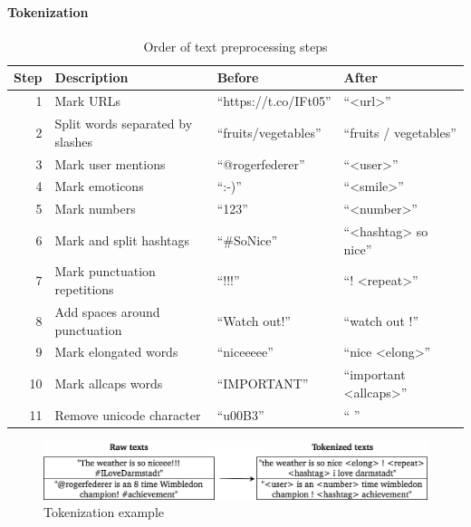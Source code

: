 \paragraph{Tokenization}
\label{sub:tokenization}


\begin{table}
\begin{tabular}{rlll}
\toprule
Step & Description & Before & After \\
\midrule
1 & Mark URLs & ``https://t.co/IFt05'' & ``<url>'' \\
2 & Split words separated by slashes & ``fruits/vegetables'' & ``fruits / vegetables'' \\
3 & Mark user mentions & ``@rogerfederer'' & ``<user>'' \\
4 & Mark emoticons & ``:-)'' & ``<smile>'' \\
5 & Mark numbers & ``123'' & ``<number>'' \\
6 & Mark and split hashtags & ``\#SoNice'' & ``<hashtag> so nice'' \\
7 & Mark punctuation repetitions & ``!!!'' & ``! <repeat>'' \\
8 & Add spaces around punctuation & ``Watch out!'' & ``watch out !'' \\
9 & Mark elongated words & ``niceeeee'' & ``nice <elong>'' \\
10 & Mark allcaps words & ``IMPORTANT'' & ``important <allcaps>'' \\
11 & Remove unicode character & ``u00B3'' & `` '' \\
\bottomrule
\end{tabular}
\caption{Order of text preprocessing steps}
\label{tab:text_preprocessing}
\end{table}

\begin{figure}[h]
  \includegraphics[width=\textwidth]{img/text_preprocessing_1}
  \caption{Tokenization example}
\label{fig:tokenization}
\end{figure}

